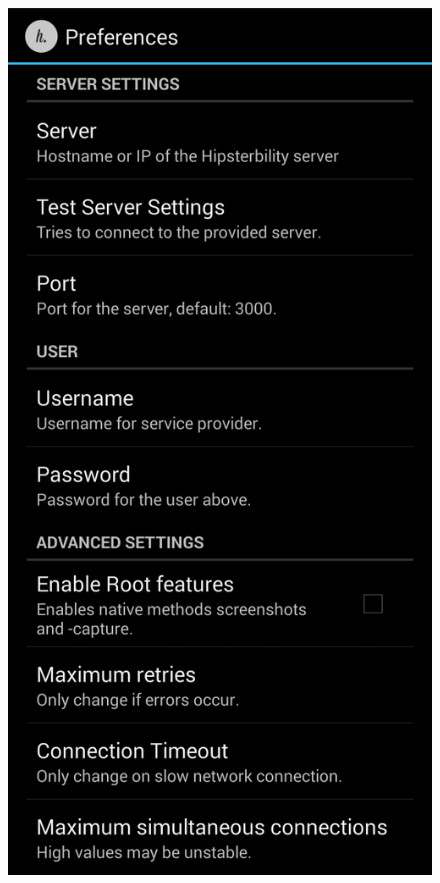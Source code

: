 \begin{figure}
	\centering
	\includegraphics[width=\linewidth]{img/screen_settings}
	 \label{fig:screen_settings}
	\vspace{-35mm}
\end{figure}

